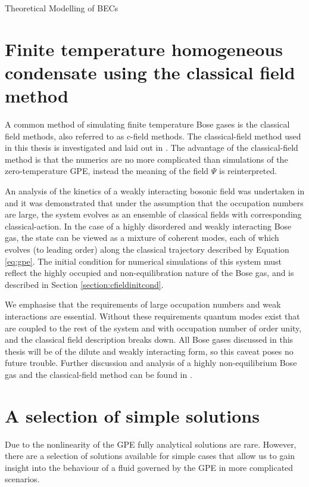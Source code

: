 \begin{chapter}{\label{cha:theoretical_model}Theoretical Modelling of BECs}
\section{\label{section:cfield} Finite temperature homogeneous condensate using the classical field method}

A common method of simulating finite temperature Bose gases is the classical field methods, also referred to as c-field methods. The classical-field method used in this thesis is investigated and laid out in \cite{PhysRevA.66.013603}. The advantage of the classical-field method is that the numerics are no more complicated than simulations of the zero-temperature GPE, instead the meaning of the field $\Psi$ is reinterpreted.

An analysis of the kinetics of a weakly interacting bosonic field was undertaken in \cite{PhysRev.147.214} and it was demonstrated that under the assumption that the occupation numbers are large, the system evolves as an ensemble of classical fields with corresponding classical-action. In the case of a highly disordered and weakly interacting Bose gas, the state can be viewed as a mixture of coherent modes, each of which evolves (to leading order) along the classical trajectory described by Equation \ref{eq:gpe}. The initial condition for numerical simulations of this system must reflect the highly occupied and non-equilibration nature of the Bose gas, and is described in Section \ref{section:cfieldinitcond}.

We emphasise that the requirements of large occupation numbers and weak interactions are essential. Without these requirements quantum modes exist that are coupled to the rest of the system and with occupation number of order unity, and the classical field description breaks down. All Bose gases discussed in this thesis will be of the dilute and weakly interacting form, so this caveat poses no future trouble. Further discussion and analysis of a highly non-equilibrium Bose gas and the classical-field method can be found in \cite{PhysRevA.66.013603}.

\section{\label{section:solutions} A selection of simple solutions}
	Due to the nonlinearity of the GPE fully analytical solutions are rare. However, there are a selection of solutions available for simple cases that allow us to gain insight into the behaviour of a fluid governed by the GPE in more complicated scenarios.

\end{chapter}
